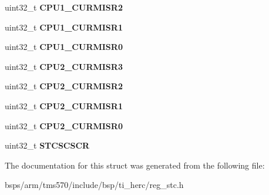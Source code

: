 \begin{DoxyCompactItemize}
uint32\+\_\+t {\bfseries C\+P\+U1\+\_\+\+C\+U\+R\+M\+I\+S\+R2}
\item 
\mbox{\label{structtms570__stc__t_a241a4d6c35ad844b7f5c6ac31a0cdfa7}} 
uint32\+\_\+t {\bfseries C\+P\+U1\+\_\+\+C\+U\+R\+M\+I\+S\+R1}
\item 
\mbox{\label{structtms570__stc__t_a6ce25a8897ef014290138c8581f4d49c}} 
uint32\+\_\+t {\bfseries C\+P\+U1\+\_\+\+C\+U\+R\+M\+I\+S\+R0}
\item 
\mbox{\label{structtms570__stc__t_adffac0108185037e778020d55a99c3ae}} 
uint32\+\_\+t {\bfseries C\+P\+U2\+\_\+\+C\+U\+R\+M\+I\+S\+R3}
\item 
\mbox{\label{structtms570__stc__t_ab4a318abd7a4e1289b70c905506a3dfc}} 
uint32\+\_\+t {\bfseries C\+P\+U2\+\_\+\+C\+U\+R\+M\+I\+S\+R2}
\item 
\mbox{\label{structtms570__stc__t_a46f4c735fbacffa473227a37aab396d9}} 
uint32\+\_\+t {\bfseries C\+P\+U2\+\_\+\+C\+U\+R\+M\+I\+S\+R1}
\item 
\mbox{\label{structtms570__stc__t_ad12b3c994b3cfe3d5d01518d17b44d2d}} 
uint32\+\_\+t {\bfseries C\+P\+U2\+\_\+\+C\+U\+R\+M\+I\+S\+R0}
\item 
\mbox{\label{structtms570__stc__t_a0f3e6c68ab876a1034d7a444e2ddfef1}} 
uint32\+\_\+t {\bfseries S\+T\+C\+S\+C\+S\+CR}
\end{DoxyCompactItemize}


The documentation for this struct was generated from the following file\+:\begin{DoxyCompactItemize}
\item 
bsps/arm/tms570/include/bsp/ti\+\_\+herc/reg\+\_\+stc.\+h\end{DoxyCompactItemize}
